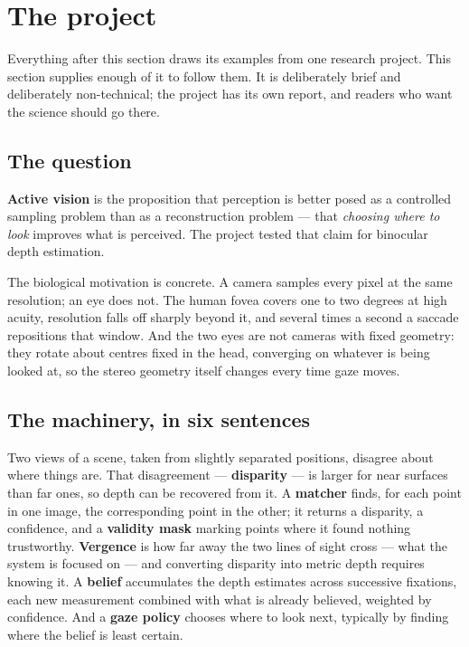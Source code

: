 \section{The project}

Everything after this section draws its examples from one research project. This section supplies enough of it to follow them. It is deliberately brief and deliberately non-technical; the project has its own report, and readers who want the science should go there.

\subsection{The question}

\textbf{Active vision} is the proposition that perception is better posed as a controlled sampling problem than as a reconstruction problem --- that \textit{choosing where to look} improves what is perceived. The project tested that claim for binocular depth estimation.

The biological motivation is concrete. A camera samples every pixel at the same resolution; an eye does not. The human fovea covers one to two degrees at high acuity, resolution falls off sharply beyond it, and several times a second a saccade repositions that window. And the two eyes are not cameras with fixed geometry: they rotate about centres fixed in the head, converging on whatever is being looked at, so the stereo geometry itself changes every time gaze moves.

\subsection{The machinery, in six sentences}

Two views of a scene, taken from slightly separated positions, disagree about where things are. That disagreement --- \textbf{disparity} --- is larger for near surfaces than far ones, so depth can be recovered from it. A \textbf{matcher} finds, for each point in one image, the corresponding point in the other; it returns a disparity, a confidence, and a \textbf{validity mask} marking points where it found nothing trustworthy. \textbf{Vergence} is how far away the two lines of sight cross --- what the system is focused on --- and converting disparity into metric depth requires knowing it. A \textbf{belief} accumulates the depth estimates across successive fixations, each new measurement combined with what is already believed, weighted by confidence. And a \textbf{gaze policy} chooses where to look next, typically by finding where the belief is least certain.

